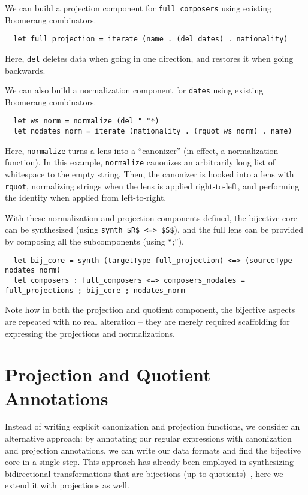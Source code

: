 \documentclass[a4paper]{article}
\begin{document}
We can build a projection component for \lstinline{full_composers} using
existing Boomerang combinators.
%
\begin{lstlisting}
  let full_projection = iterate (name . (del dates) . nationality)
\end{lstlisting}
%
Here, \lstinline{del} deletes data when going in one direction, and restores it
when going backwards.

We can also build a normalization component for \lstinline{dates} using existing
Boomerang combinators.
%
\begin{lstlisting}
  let ws_norm = normalize (del " "*)
  let nodates_norm = iterate (nationality . (rquot ws_norm) . name)
\end{lstlisting}
%
Here, \lstinline{normalize} turns a lens into a ``canonizer'' (in effect, a
normalization function). In this example, \lstinline{normalize} canonizes an
arbitrarily long list of whitespace to the empty string. Then, the canonizer is
hooked into a lens with \lstinline{rquot}, normalizing strings when the lens is
applied right-to-left, and performing the identity when applied from left-to-right.

With these normalization and projection components defined, the bijective core
can be synthesized (using \lstinline{synth $R$ <=> $S$}), and the full lens can be
provided by composing all the subcomponents (using ``;'').
\begin{lstlisting}
  let bij_core = synth (targetType full_projection) <=> (sourceType nodates_norm)
  let composers : full_composers <=> composers_nodates = full_projections ; bij_core ; nodates_norm
\end{lstlisting}

Note how in both the projection and quotient component, the bijective aspects
are repeated with no real alteration -- they are merely required scaffolding
for expressing the projections and normalizations.

\section{Projection and Quotient Annotations}

Instead of writing explicit canonization and projection functions, we
consider an alternative approach: by annotating our regular expressions with
canonization and projection annotations, we can write our data formats and find
the bijective core in a single step. This approach has already been employed in
synthesizing bidirectional transformations that are bijections (up to
quotients)~\cite{maina+:quotient-synthesis}, here we extend it with projections as well.
\end{document}
